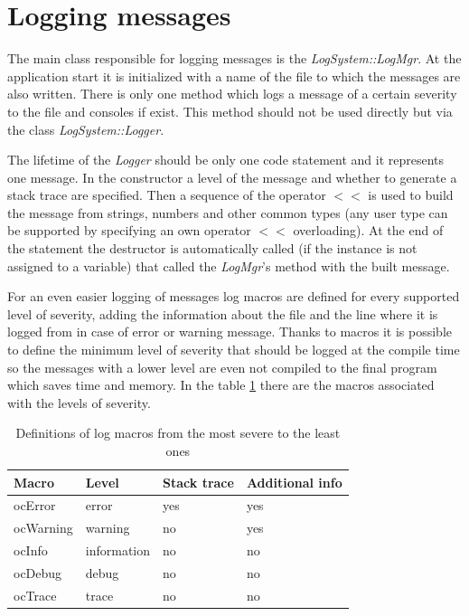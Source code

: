 \documentclass[a4paper, 12pt]{report}
\begin{document}
\section{Logging messages}
\label{sec:logging}

The main class responsible for logging messages is the \emph{LogSystem::LogMgr}. At the application start it is initialized with a name of the file to which the messages are also written. There is only one method which logs a message of a certain severity to the file and consoles if exist. This method should not be used directly but via the class \emph{LogSystem::Logger}.

The lifetime of the \emph{Logger} should be only one code statement and it represents one message. In the constructor a level of the message and whether to generate a stack trace are specified. Then a sequence of the operator $<<$ is used to build the message from strings, numbers and other common types (any user type can be supported by specifying an own operator $<<$ overloading). At the end of the statement the destructor is automatically called (if the instance is not assigned to a variable) that called the \emph{LogMgr}'s method with the built message.

For an even easier logging of messages log macros are defined for every supported level of severity, adding the information about the file and the line where it is logged from in case of error or warning message. Thanks to macros it is possible to define the minimum level of severity that should be logged at the compile time so the messages with a lower level are even not compiled to the final program which saves time and memory. In the table \ref{tab:log-macros} there are the macros associated with the levels of severity.

\begin{table}[htbp]
	\centering
		\begin{tabular}{|l|l|l|l|}
			\hline
			Macro & Level & Stack trace & Additional info \\
			\hline
			ocError & error & yes & yes \\
			ocWarning & warning & no & yes \\
			ocInfo & information & no & no \\
			ocDebug & debug & no & no \\
			ocTrace & trace & no & no \\
			\hline
		\end{tabular}
	\caption[Definitions of log macros]{Definitions of log macros from the most severe to the least ones}
	\label{tab:log-macros}
\end{table}
\end{document}
